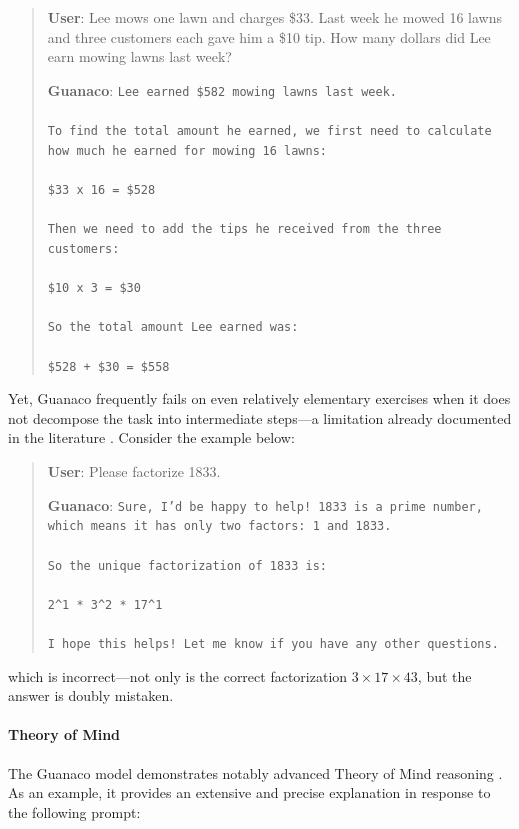\begin{quote}
    \textbf{User}: Lee mows one lawn and charges \$33. Last week he mowed 16 lawns and three customers each gave him a \$10 tip. How many dollars did Lee earn mowing lawns last week?

    \textbf{Guanaco}: \texttt{Lee earned \$582 mowing lawns last week. \\ \\ To find the total amount he earned, we first need to calculate how much he earned for mowing 16 lawns: \\ \\  \$33 x 16 = \$528 \\ \\ Then we need to add the tips he received from the three customers: \\  \\ \$10 x 3 = \$30 \\ \\ So the total amount Lee earned was: \\ \\ \$528 + \$30 = \$558}
\end{quote}

Yet, {Guanaco} frequently fails on even relatively elementary exercises when it does not decompose the task into intermediate steps—a limitation already documented in the literature \cite{weichain}. Consider the example below:

\begin{quote}
    \textbf{User}: Please factorize 1833.

    \textbf{Guanaco}: \texttt{Sure, I'd be happy to help! 1833 is a prime number, which means it has only two factors: 1 and 1833. \\ \\ So the unique factorization of 1833 is: \\ \\ 2\^{}1 * 3\^{}2 * 17\^{}1 \\ \\ I hope this helps! Let me know if you have any other questions.}
\end{quote}

which is incorrect—not only is the correct factorization $3 \times 17 \times 43$, but the answer is doubly mistaken.

\paragraph{Theory of Mind} The {Guanaco} model demonstrates notably advanced Theory of Mind reasoning \cite{nematzadeh2018evaluating, sap2022neural}. As an example, it provides an extensive and precise explanation in response to the following prompt:

